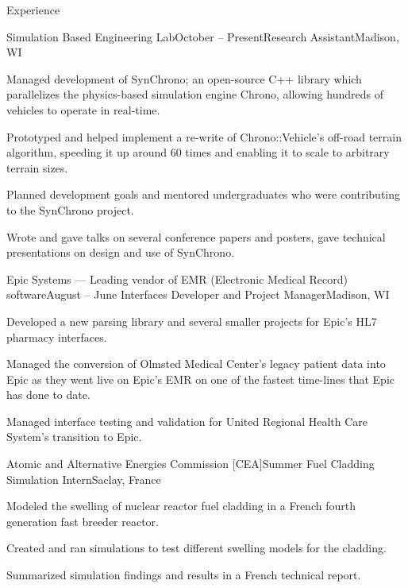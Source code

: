 \documentclass{resume} %
\begin{document}

\begin{rSection}{Experience}

\begin{rSubsection}{Simulation Based Engineering Lab}{October  -- Present}{Research Assistant}{Madison, WI}
\item Managed development of SynChrono; an open-source C++ library which parallelizes the physics-based simulation engine Chrono, allowing hundreds of vehicles to operate in real-time. 
\item Prototyped and helped implement a re-write of Chrono::Vehicle's off-road terrain algorithm, speeding it up around 60 times and enabling it to scale to arbitrary terrain sizes.
\item Planned development goals and mentored undergraduates who were contributing to the SynChrono project.
\item Wrote and gave talks on several conference papers and posters, gave technical presentations on design and use of SynChrono.
\end{rSubsection}

\begin{rSubsection}{Epic Systems \textnormal{--- Leading vendor of EMR (Electronic Medical Record) software}}{August  -- June }{Interfaces Developer and Project Manager}{Madison, WI}
\item Developed a new parsing library and several smaller projects for Epic's HL7 pharmacy interfaces.
\item Managed the conversion of Olmsted Medical Center's legacy patient data into Epic as they went live on Epic's EMR on one of the fastest time-lines that Epic has done to date.
\item Managed interface testing and validation for United Regional Health Care System's transition to Epic.
\end{rSubsection}

\begin{rSubsection}{Atomic and Alternative Energies Commission [CEA]}{Summer }{Fuel Cladding Simulation Intern}{Saclay, France}
\item Modeled the swelling of nuclear reactor fuel cladding in a French fourth generation fast breeder reactor.
\item Created and ran simulations to test different swelling models for the cladding.
\item Summarized simulation findings and results in a French technical report.
\end{rSubsection}


\end{rSection}
\end{document}
